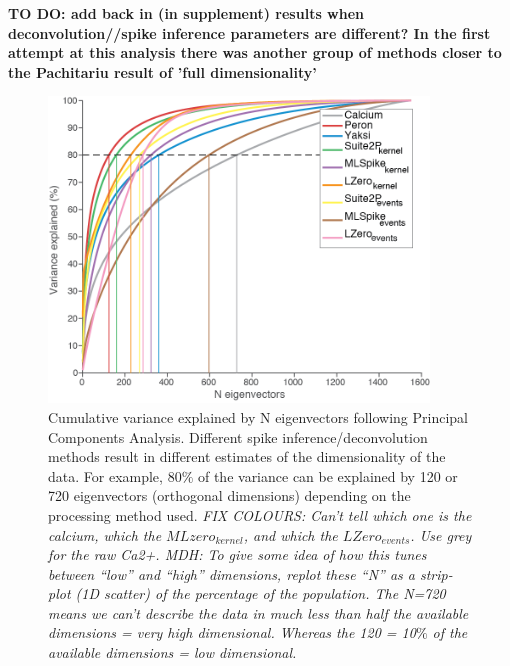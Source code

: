 \documentclass[a4paper,10pt,twocolumn]{article}
\begin{document}
\textbf{TO DO: add back in (in supplement) results when deconvolution//spike inference parameters are different? In the first attempt at this analysis there was another group of methods closer to the Pachitariu result of 'full dimensionality'}


\begin{figure}
\includegraphics[width=0.9\textwidth]{full_figs/why_deconvolve_F7_2.png}
\caption{\label{fig:dimensionality}Cumulative variance explained by N eigenvectors following Principal Components Analysis. Different spike inference/deconvolution methods result in different estimates of the dimensionality of the data. For example, 80$\%$ of the variance can be explained by 120 or 720 eigenvectors (orthogonal dimensions) depending on the processing method used. \emph{FIX COLOURS: Can't tell which one is the calcium, which the $MLzero_{kernel}$, and which the $LZero_{events}$. Use grey for the raw Ca2+. MDH: To give some idea of how this tunes between “low” and “high” dimensions, replot these “N” as a strip-plot (1D scatter) of the percentage of the population. The N=720 means we can’t describe the data in much less than half the available dimensions = very high dimensional. Whereas the 120 = 10$\%$ of the available dimensions = low dimensional.}}
\end{figure}




\end{document}
